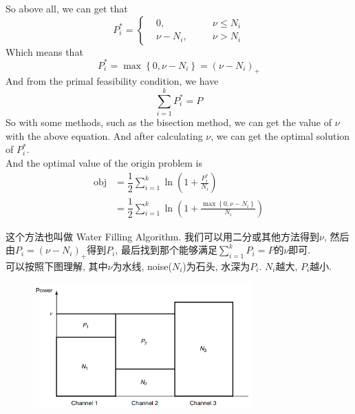 So above all, we can get that
$$P_i^* = \left\{
\begin{aligned}
&0, &&\quad \nu \leq N_i \\
&\nu - N_i, &&\quad \nu > N_i
\end{aligned}
\right.$$
Which means that
$$P_i^* = \max\left\{0, \nu - N_i\right\} = (\nu - N_i)_+$$
And from the primal feasibility condition, we have
$$\sum_{i=1}^k P_i^* = P$$
So with some methods, such as the bisection method, we can get the value of $\nu$ with the above equation. And after calculating $\nu$, we can get the optimal solution of $P_i^*$. \\
And the optimal value of the origin problem is
\begin{align*}
\text{obj} &= \dfrac{1}{2}\sum_{i=1}^k \ln \left(1+\frac{P_i^*}{N_i}\right) \\
&= \dfrac{1}{2}\sum_{i=1}^k \ln \left(1+\frac{\max\left\{0, \nu - N_i\right\}}{N_i}\right)
\end{align*}

这个方法也叫做 Water Filling Algorithm. 我们可以用二分或其他方法得到$\nu$, 然后由$P_i=(\nu-N_i)_+$得到$P_i$, 最后找到那个能够满足$\sum\limits_{i=1}^k P_i=P$的$\nu$即可. \\
可以按照下图理解, 其中$\nu$为水线, noise($N_i$)为石头, 水深为$P_i$. $N_i$越大, $P_i$越小.
\begin{figure}[htbp]
    \centering
    \includegraphics[width=0.75\textwidth]{./figures/chapter7/water_filling.png}
\end{figure}

